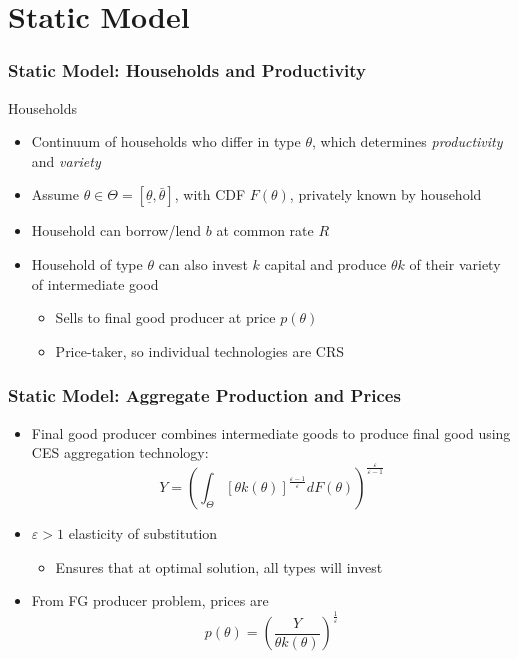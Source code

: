 \documentclass{beamer}
\begin{document}
\section{Static Model}
\begin{frame}
    \frametitle{Static Model: Households and Productivity}

    Households
    \begin{itemize}
        \item Continuum of households who differ in type \( \theta \), which determines \textit{productivity} and \textit{variety} 
        \item Assume \( \theta\in\Theta=\left[ \underline{\theta}, \bar{\theta} \right] \), with CDF \( F(\theta) \), privately known by household
        \item Household can borrow/lend \( b \) at common rate \( R \)
        \item Household of type \( \theta \) can also invest \( k \) capital and produce \( \theta k \) of their variety of intermediate good 
        \begin{itemize}
            \item Sells to final good producer at price \( p(\theta) \) 
            \item Price-taker, so individual technologies are CRS
        \end{itemize}
    \end{itemize}

\end{frame}

\begin{frame}
    \frametitle{Static Model: Aggregate Production and Prices}

    
    \begin{itemize}
        \item Final good producer combines intermediate goods to produce final good using CES aggregation technology: 
        \begin{equation*}
            Y = \left(\int_{\Theta}\left[\theta k\left(\theta\right)\right]^{\frac{\varepsilon-1}{\varepsilon}}dF\left(\theta\right)\right)^{\frac{\varepsilon}{\varepsilon-1}} 
        \end{equation*} 
        \item \( \varepsilon>1 \) elasticity of substitution 
        \begin{itemize}
            \item Ensures that at optimal solution, all types will invest
        \end{itemize}
        \item From FG producer problem, prices are 
        \begin{equation*}
            p(\theta) = \left(\frac{Y}{\theta k\left(\theta\right)}\right)^{\frac{1}{\varepsilon}}
        \end{equation*}
    \end{itemize}

\end{frame}
\end{document}
